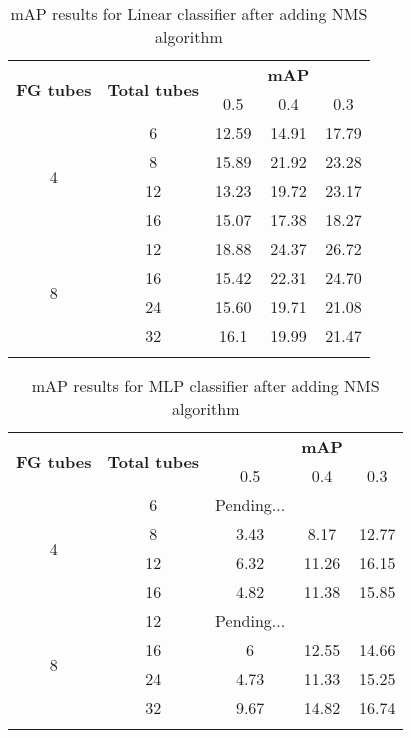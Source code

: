 \begin{center}
  \begin{longtable}{|| c | c || c c c ||}
    \hline
    \multirow{2}{*}{\textbf{FG tubes}} & \multirow{2}{*}{\textbf{Total tubes}} & {} & \textbf{mAP} & {} \\
    {} & {} & 0.5 & 0.4 & 0.3 \\
    \hline
    \multirow{4}{*}{4} & 6 & 12.59 & 14.91 & 17.79  \\
    \cline{2-5}
    {} & 8 & 15.89 & 21.92 & 23.28 \\
    \cline{2-5}
    {} & 12 & 13.23 & 19.72 & 23.17 \\
    \cline{2-5}
    {} & 16 & 15.07 & 17.38 & 18.27 \\
    \hline
    \multirow{4}{*}{8} & 12 & 18.88 & 24.37 & 26.72 \\
    \cline{2-5}
    {} & 16 & 15.42 & 22.31 & 24.70 \\
    \cline{2-5}
    {} & 24 & 15.60 & 19.71 & 21.08 \\
    \cline{2-5}
    {} & 32 & 16.1 & 19.99 & 21.47 \\
    \hline

  \caption{mAP results for Linear classifier after adding NMS algorithm}
  \label{table:linear_nms}
\end{longtable}
\end{center}

\begin{center}
  \begin{longtable}{|| c | c || c c c ||}
    \hline
    \multirow{2}{*}{\textbf{FG tubes}} & \multirow{2}{*}{\textbf{Total tubes}} & {} & \textbf{mAP} & {} \\
    {} & {} & 0.5 & 0.4 & 0.3 \\
    \hline
    \multirow{4}{*}{4} & 6 &  Pending...\\
    \cline{2-5}
    {} & 8 & 3.43 & 8.17 & 12.77 \\
    \cline{2-5}
    {} & 12 & 6.32 & 11.26 & 16.15 \\
    \cline{2-5}
    {} & 16 & 4.82 & 11.38 & 15.85 \\
    \hline
    \multirow{4}{*}{8} & 12 & Pending... \\
    \cline{2-5}
    {} & 16 & 6 & 12.55 & 14.66 \\
    \cline{2-5}
    {} & 24 & 4.73 & 11.33 & 15.25 \\
    \cline{2-5}
    {} & 32 & 9.67 & 14.82 & 16.74 \\
    \hline

  \caption{mAP results for MLP classifier after adding NMS algorithm}
  \label{table:mlp_nms}
\end{longtable}
\end{center}

